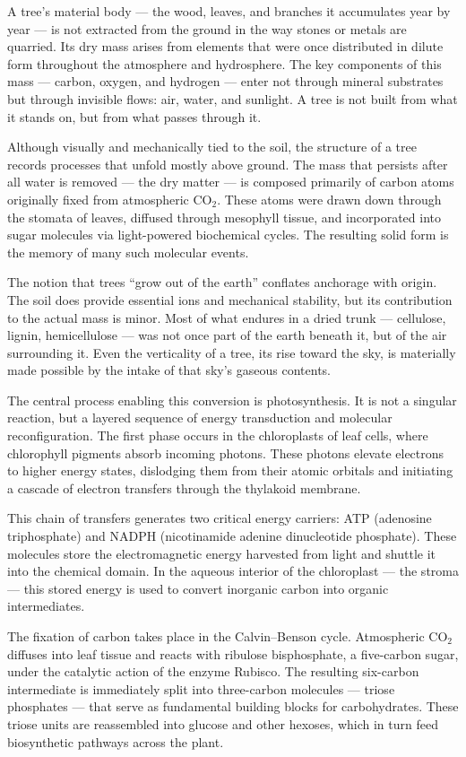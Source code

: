 A tree’s material body — the wood, leaves, and branches it accumulates year by year — is not extracted from the ground in the way stones or metals are quarried. Its dry mass arises from elements that were once distributed in dilute form throughout the atmosphere and hydrosphere. The key components of this mass — carbon, oxygen, and hydrogen — enter not through mineral substrates but through invisible flows: air, water, and sunlight. A tree is not built from what it stands on, but from what passes through it.

Although visually and mechanically tied to the soil, the structure of a tree records processes that unfold mostly above ground. The mass that persists after all water is removed — the dry matter — is composed primarily of carbon atoms originally fixed from atmospheric \(\mathrm{CO}_2\). These atoms were drawn down through the stomata of leaves, diffused through mesophyll tissue, and incorporated into sugar molecules via light-powered biochemical cycles. The resulting solid form is the memory of many such molecular events.

The notion that trees “grow out of the earth” conflates anchorage with origin. The soil does provide essential ions and mechanical stability, but its contribution to the actual mass is minor. Most of what endures in a dried trunk — cellulose, lignin, hemicellulose — was not once part of the earth beneath it, but of the air surrounding it. Even the verticality of a tree, its rise toward the sky, is materially made possible by the intake of that sky’s gaseous contents.

The central process enabling this conversion is photosynthesis. It is not a singular reaction, but a layered sequence of energy transduction and molecular reconfiguration. The first phase occurs in the chloroplasts of leaf cells, where chlorophyll pigments absorb incoming photons. These photons elevate electrons to higher energy states, dislodging them from their atomic orbitals and initiating a cascade of electron transfers through the thylakoid membrane.

This chain of transfers generates two critical energy carriers: ATP (adenosine triphosphate) and NADPH (nicotinamide adenine dinucleotide phosphate). These molecules store the electromagnetic energy harvested from light and shuttle it into the chemical domain. In the aqueous interior of the chloroplast — the stroma — this stored energy is used to convert inorganic carbon into organic intermediates.

The fixation of carbon takes place in the Calvin–Benson cycle. Atmospheric \(\mathrm{CO}_2\) diffuses into leaf tissue and reacts with ribulose bisphosphate, a five-carbon sugar, under the catalytic action of the enzyme Rubisco. The resulting six-carbon intermediate is immediately split into three-carbon molecules — triose phosphates — that serve as fundamental building blocks for carbohydrates. These triose units are reassembled into glucose and other hexoses, which in turn feed biosynthetic pathways across the plant.

